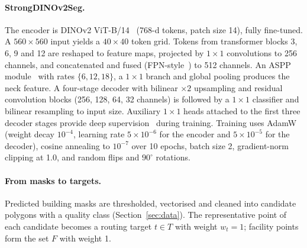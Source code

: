 \documentclass[journal]{IEEEtran}
\begin{document}
\paragraph{StrongDINOv2Seg.}
The encoder is DINOv2 ViT-B/14~\cite{oquab2023dinov2} (768-d tokens, patch size 14), fully fine-tuned. A $560\times560$ input yields a $40\times40$ token grid. Tokens from transformer blocks 3, 6, 9 and 12 are reshaped to feature maps, projected by $1\times1$ convolutions to 256 channels, and concatenated and fused (FPN-style~\cite{lin2017fpn}) to 512 channels. An ASPP module~\cite{chen2018deeplabv3plus} with rates $\{6,12,18\}$, a $1\times1$ branch and global pooling produces the neck feature. A four-stage decoder with bilinear $\times2$ upsampling and residual convolution blocks (256, 128, 64, 32 channels) is followed by a $1\times1$ classifier and bilinear resampling to input size. Auxiliary $1\times1$ heads attached to the first three decoder stages provide deep supervision~\cite{lee2015dsn} during training. Training uses AdamW (weight decay $10^{-4}$, learning rate $5\times10^{-6}$ for the encoder and $5\times10^{-5}$ for the decoder), cosine annealing to $10^{-7}$ over 10 epochs, batch size 2, gradient-norm clipping at 1.0, and random flips and $90^\circ$ rotations.

\paragraph{From masks to targets.}
Predicted building masks are thresholded, vectorised and cleaned into candidate polygons with a quality class (Section~\ref{sec:data}). The representative point of each candidate becomes a routing target $t\in T$ with weight $w_t=1$; facility points form the set $F$ with weight 1.
\end{document}
